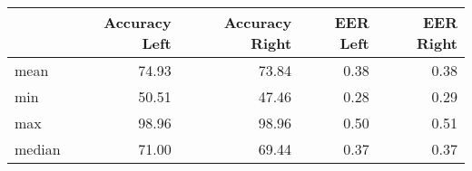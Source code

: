 \begin{tabular}{lrrrr}
\toprule
{} &  Accuracy Left &  Accuracy Right &  EER Left &  EER Right \\
\midrule
mean   &          74.93 &           73.84 &      0.38 &       0.38 \\
min    &          50.51 &           47.46 &      0.28 &       0.29 \\
max    &          98.96 &           98.96 &      0.50 &       0.51 \\
median &          71.00 &           69.44 &      0.37 &       0.37 \\
\bottomrule
\end{tabular}
